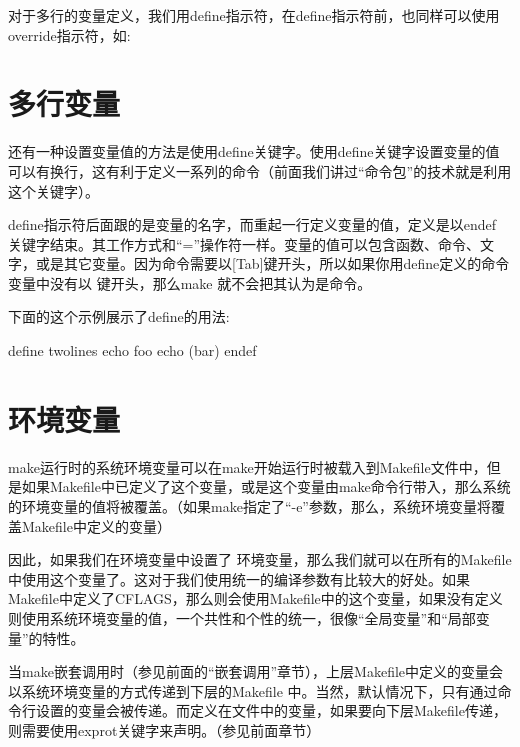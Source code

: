 \documentclass[a4paper,10pt]{sphinxmanual}
\begin{document}
对于多行的变量定义，我们用define指示符，在define指示符前，也同样可以使用override指示符，如:

\begin{sphinxVerbatim}[commandchars=\\\{\}]
  
\end{sphinxVerbatim}


\section{多行变量}
\label{\detokenize{variables:id6}}
还有一种设置变量值的方法是使用define关键字。使用define关键字设置变量的值可以有换行，这有利于定义一系列的命令（前面我们讲过“命令包”的技术就是利用这个关键字）。

define指示符后面跟的是变量的名字，而重起一行定义变量的值，定义是以endef 关键字结束。其工作方式和“=”操作符一样。变量的值可以包含函数、命令、文字，或是其它变量。因为命令需要以{[}Tab{]}键开头，所以如果你用define定义的命令变量中没有以  键开头，那么make 就不会把其认为是命令。

下面的这个示例展示了define的用法:

\begin{sphinxVerbatim}[commandchars=\\\{\}]
define two\PYGZhy{}lines
echo foo
echo \PYGZdl{}(bar)
endef
\end{sphinxVerbatim}


\section{环境变量}
\label{\detokenize{variables:id7}}
make运行时的系统环境变量可以在make开始运行时被载入到Makefile文件中，但是如果Makefile中已定义了这个变量，或是这个变量由make命令行带入，那么系统的环境变量的值将被覆盖。（如果make指定了“-e”参数，那么，系统环境变量将覆盖Makefile中定义的变量）

因此，如果我们在环境变量中设置了  环境变量，那么我们就可以在所有的Makefile中使用这个变量了。这对于我们使用统一的编译参数有比较大的好处。如果Makefile中定义了CFLAGS，那么则会使用Makefile中的这个变量，如果没有定义则使用系统环境变量的值，一个共性和个性的统一，很像“全局变量”和“局部变量”的特性。

当make嵌套调用时（参见前面的“嵌套调用”章节），上层Makefile中定义的变量会以系统环境变量的方式传递到下层的Makefile 中。当然，默认情况下，只有通过命令行设置的变量会被传递。而定义在文件中的变量，如果要向下层Makefile传递，则需要使用exprot关键字来声明。（参见前面章节）
\end{document}

